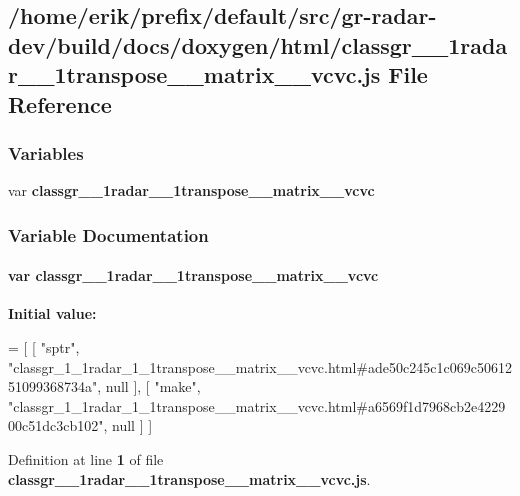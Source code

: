 \subsection{/home/erik/prefix/default/src/gr-\/radar-\/dev/build/docs/doxygen/html/classgr\+\_\+\_\+1radar\+\_\+\_\+1transpose\+\_\+\+\_\+matrix\+\_\+\+\_\+vcvc.js File Reference}
\label{classgr__1__1radar__1__1transpose____matrix____vcvc_8js}
\subsubsection*{Variables}
\begin{DoxyCompactItemize}
\item 
var {\bf classgr\+\_\+\_\+1radar\+\_\+\_\+1transpose\+\_\+\+\_\+matrix\+\_\+\+\_\+vcvc}
\end{DoxyCompactItemize}


\subsubsection{Variable Documentation}
\paragraph[{classgr\+\_\+1\+\_\+1radar\+\_\+1\+\_\+1transpose\+\_\+\+\_\+matrix\+\_\+\+\_\+vcvc}]{\setlength{\rightskip}{0pt plus 5cm}var classgr\+\_\+\_\+1radar\+\_\+\_\+1transpose\+\_\+\+\_\+matrix\+\_\+\+\_\+vcvc}\label{classgr__1__1radar__1__1transpose____matrix____vcvc_8js_ab358cefe6b5fa37dba11cf6dbb3e21fe}
{\bfseries Initial value\+:}
\begin{DoxyCode}
=
[
    [ \textcolor{stringliteral}{"sptr"}, \textcolor{stringliteral}{"classgr\_1\_1radar\_1\_1transpose\_\_matrix\_\_vcvc.html#ade50c245c1c069c5061251099368734a"}, null ],
    [ \textcolor{stringliteral}{"make"}, \textcolor{stringliteral}{"classgr\_1\_1radar\_1\_1transpose\_\_matrix\_\_vcvc.html#a6569f1d7968cb2e422900c51dc3cb102"}, null ]
]
\end{DoxyCode}


Definition at line {\bf 1} of file {\bf classgr\+\_\+\_\+1radar\+\_\+\_\+1transpose\+\_\+\+\_\+matrix\+\_\+\+\_\+vcvc.\+js}.

